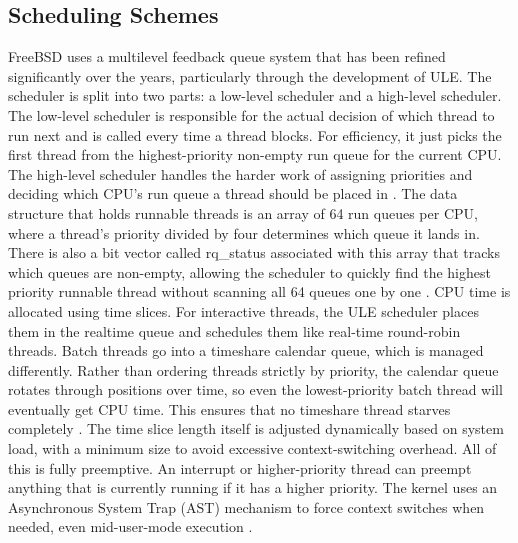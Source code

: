 \subsection{Scheduling Schemes}
FreeBSD uses a multilevel feedback queue system that has been refined significantly over the years, particularly through the development of ULE. The scheduler is split into two parts: a low-level scheduler and a high-level scheduler. The low-level scheduler is responsible for the actual decision of which thread to run next and is called every time a thread blocks. For efficiency, it just picks the first thread from the highest-priority non-empty run queue for the current CPU. The high-level scheduler handles the harder work of assigning priorities and deciding which CPU's run queue a thread should be placed in \parencite{watson2015}.
The data structure that holds runnable threads is an array of 64 run queues per CPU, where a thread's priority divided by four determines which queue it lands in. There is also a bit vector called rq\_status associated with this array that tracks which queues are non-empty, allowing the scheduler to quickly find the highest priority runnable thread without scanning all 64 queues one by one \parencite{watson2015}.
CPU time is allocated using time slices. For interactive threads, the ULE scheduler places them in the realtime queue and schedules them like real-time round-robin threads. Batch threads go into a timeshare calendar queue, which is managed differently. Rather than ordering threads strictly by priority, the calendar queue rotates through positions over time, so even the lowest-priority batch thread will eventually get CPU time. This ensures that no timeshare thread starves completely \parencite{watson2015}. The time slice length itself is adjusted dynamically based on system load, with a minimum size to avoid excessive context-switching overhead.
All of this is fully preemptive. An interrupt or higher-priority thread can preempt anything that is currently running if it has a higher priority. The kernel uses an Asynchronous System Trap (AST) mechanism to force context switches when needed, even mid-user-mode execution \parencite{watson2015}.

